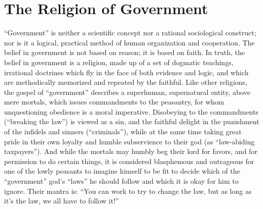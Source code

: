 \documentclass{book}
\begin{document}
\section{The Religion of Government}

\enquote{Government} is neither a scientific concept nor a rational sociological construct; nor is it a logical, practical method of human organization and cooperation. The belief in government is not based on reason; it is based on faith. In truth, the belief in government is a religion, made up of a set of dogmatic teachings, irrational doctrines which fly in the face of both evidence and logic, and which are methodically memorized and repeated by the faithful. Like other religions, the gospel of \enquote{government} describes a superhuman, supernatural entity, above mere mortals, which issues commandments to the peasantry, for whom unquestioning obedience is a moral imperative. Disobeying to the commandments (\enquote{breaking the law}) is viewed as a sin, and the faithful delight in the punishment of the infidels and sinners (\enquote{criminals}), while at the same time taking great pride in their own loyalty and humble subservience to their god (as \enquote{law-abiding taxpayers}). And while the mortals may humbly beg their lord for favors, and for permission to do certain things, it is considered blasphemous and outrageous for one of the lowly peasants to imagine himself to be fit to decide which of the \enquote{government} god's \enquote{laws} he should follow and which it is okay for him to ignore. Their mantra is: \enquote{You can work to try to change the law, but as long as it's the law, we all have to follow it!}
\end{document}
